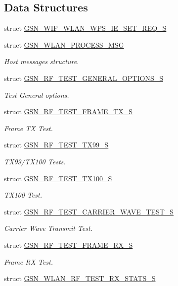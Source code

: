 \subsection*{Data Structures}
\begin{DoxyCompactItemize}
\item 
struct \hyperlink{a00415}{GSN\_\-WIF\_\-WLAN\_\-WPS\_\-IE\_\-SET\_\-REQ\_\-S}
\item 
struct \hyperlink{a00418}{GSN\_\-WLAN\_\-PROCESS\_\-MSG}
\begin{DoxyCompactList}\small\item\em Host messages structure. \end{DoxyCompactList}\item 
struct \hyperlink{a00188}{GSN\_\-RF\_\-TEST\_\-GENERAL\_\-OPTIONS\_\-S}
\begin{DoxyCompactList}\small\item\em Test General options. \end{DoxyCompactList}\item 
struct \hyperlink{a00187}{GSN\_\-RF\_\-TEST\_\-FRAME\_\-TX\_\-S}
\begin{DoxyCompactList}\small\item\em Frame TX Test. \end{DoxyCompactList}\item 
struct \hyperlink{a00190}{GSN\_\-RF\_\-TEST\_\-TX99\_\-S}
\begin{DoxyCompactList}\small\item\em TX99/TX100 Tests. \end{DoxyCompactList}\item 
struct \hyperlink{a00189}{GSN\_\-RF\_\-TEST\_\-TX100\_\-S}
\begin{DoxyCompactList}\small\item\em TX100 Test. \end{DoxyCompactList}\item 
struct \hyperlink{a00185}{GSN\_\-RF\_\-TEST\_\-CARRIER\_\-WAVE\_\-TEST\_\-S}
\begin{DoxyCompactList}\small\item\em Carrier Wave Transmit Test. \end{DoxyCompactList}\item 
struct \hyperlink{a00186}{GSN\_\-RF\_\-TEST\_\-FRAME\_\-RX\_\-S}
\begin{DoxyCompactList}\small\item\em Frame RX Test. \end{DoxyCompactList}\item 
struct \hyperlink{a00419}{GSN\_\-WLAN\_\-RF\_\-TEST\_\-RX\_\-STATS\_\-S}

\end{DoxyCompactItemize}
